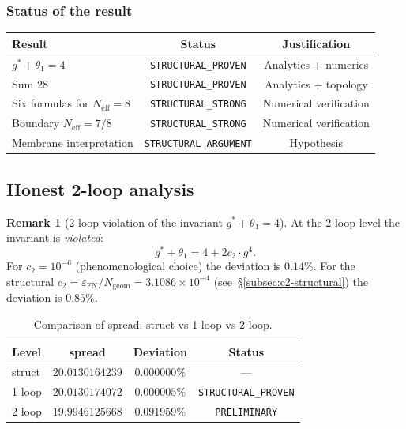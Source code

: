\documentclass[11pt,a4paper]{article}
\newcommand{\epsFN}{\ensuremath{\varepsilon_{\text{FN}}}}
\theoremstyle{definition}
\newtheorem{remark}[theorem]{Remark}
\begin{document}
\subsubsection{Status of the result}

\begin{center}
\begin{tabular}{lcc}
\toprule
Result & Status & Justification \\
\midrule
$g^* + \theta_1 = 4$ & \texttt{STRUCTURAL\_PROVEN} &
Analytics + numerics \\
Sum 28 & \texttt{STRUCTURAL\_PROVEN} &
Analytics + topology \\
Six formulas for $N_{\text{eff}} = 8$ & \texttt{STRUCTURAL\_STRONG} &
Numerical verification \\
Boundary $N_{\text{eff}} = 7/8$ & \texttt{STRUCTURAL\_STRONG} &
Numerical verification \\
Membrane interpretation & \texttt{STRUCTURAL\_ARGUMENT} &
Hypothesis \\
\bottomrule
\end{tabular}
\end{center}

\subsection{Honest 2-loop analysis}
\label{subsec:frg-2loop}

\begin{remark}[2-loop violation of the invariant $g^* + \theta_1 = 4$]
\label{rem:2loop-broken}
At the 2-loop level the invariant is \emph{violated}:
\begin{equation}
    g^* + \theta_1 = 4 + 2c_2 \cdot g^4.
    \label{eq:2loop-invariant}
\end{equation}
For $c_2 = 10^{-6}$ (phenomenological choice) the deviation
is $0.14\%$. For the structural $c_2 = \epsFN/N_{\text{geom}}
= 3.1086 \times 10^{-4}$ (see~\S\ref{subsec:c2-structural})
the deviation is $0.85\%$.
\end{remark}

\begin{table}[ht]
\centering
\caption{Comparison of spread: struct vs 1-loop vs 2-loop.}
\label{tab:spread-2loop}
\begin{tabular}{lccc}
\toprule
Level & spread & Deviation & Status \\
\midrule
struct & $20.0130164239$ & $0.000000\%$ & --- \\
1 loop & $20.0130174072$ & $\mathbf{0.000005\%}$ & \texttt{STRUCTURAL\_PROVEN} \\
2 loop & $19.9946125668$ & $0.091959\%$ & \texttt{PRELIMINARY} \\
\bottomrule
\end{tabular}
\end{table}
\end{document}

